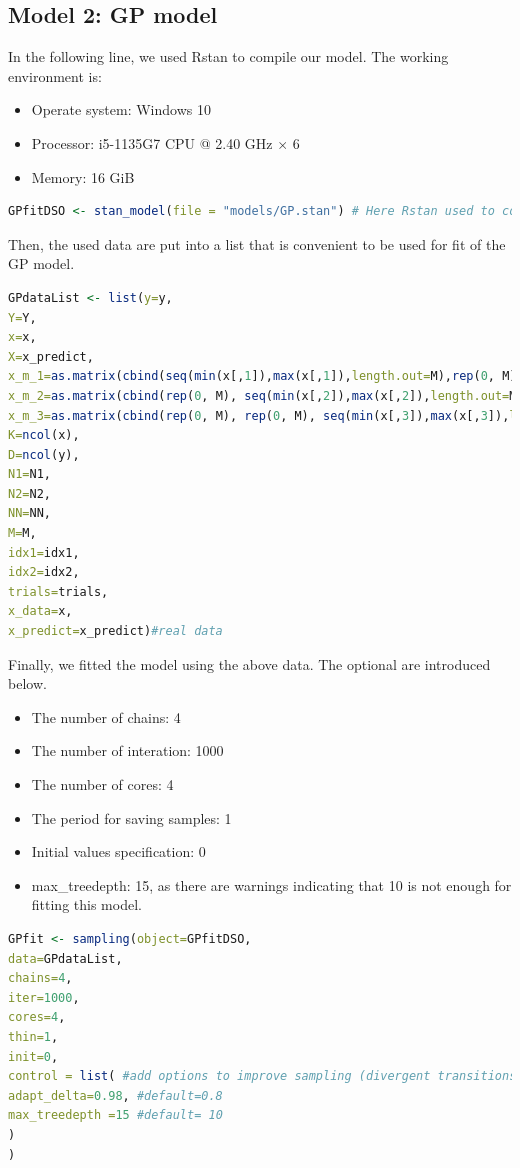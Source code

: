 \documentclass[a4paper]{artikel3}
\begin{document}
\subsection*{Model 2: GP model}
In the following line, we used Rstan to compile our model. The working environment is: 
\begin{itemize}
\item Operate system: Windows 10
\item Processor: i5-1135G7 CPU @ 2.40 GHz $\times$ 6
\item Memory: 16 GiB
\end{itemize}

\begin{lstlisting}[language=R]
GPfitDSO <- stan_model(file = "models/GP.stan") # Here Rstan used to compile our model
\end{lstlisting}

Then, the used data are put into a list that is convenient to be used for fit of the GP model. 

\begin{lstlisting}[language=R]
GPdataList <- list(y=y,
Y=Y,
x=x, 
X=x_predict,
x_m_1=as.matrix(cbind(seq(min(x[,1]),max(x[,1]),length.out=M),rep(0, M), rep(0, M))),
x_m_2=as.matrix(cbind(rep(0, M), seq(min(x[,2]),max(x[,2]),length.out=M), rep(0, M))),
x_m_3=as.matrix(cbind(rep(0, M), rep(0, M), seq(min(x[,3]),max(x[,3]),length.out=M))),
K=ncol(x), 
D=ncol(y), 
N1=N1,
N2=N2,
NN=NN,
M=M,
idx1=idx1,
idx2=idx2,
trials=trials,
x_data=x,
x_predict=x_predict)#real data 
\end{lstlisting}

Finally, we fitted the model using the above data. The optional are introduced below. 

\begin{itemize}
\item The number of chains: 4
\item The number of interation: 1000
\item The number of cores: 4
\item The period for saving samples: 1
\item Initial values specification: 0
\item max\_treedepth: 15, as there are warnings indicating that 10 is not enough for fitting this model.  
\end{itemize}

\begin{lstlisting}[language=R]
GPfit <- sampling(object=GPfitDSO,
data=GPdataList,
chains=4,
iter=1000,
cores=4,
thin=1,
init=0,
control = list( #add options to improve sampling (divergent transitions)
adapt_delta=0.98, #default=0.8
max_treedepth =15 #default= 10
)
)
\end{lstlisting}
\end{document}
